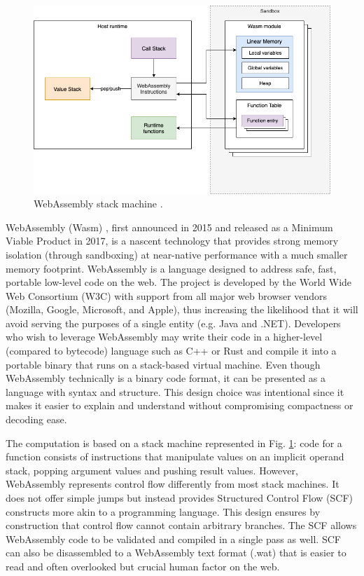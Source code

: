 \begin{figure}[ht]
\centering
\includegraphics[width=\columnwidth]{figures/webassembly}
\caption{WebAssembly stack machine \label{fig:webassembly}.}
\end{figure}

WebAssembly (Wasm) \cite{haas2017bringing}, first announced in 2015 and released as a Minimum Viable Product in 2017, is a nascent technology that provides strong memory isolation (through sandboxing) at near-native performance with a much smaller memory footprint. WebAssembly is a language designed to address safe, fast, portable low-level code on the web. The project is developed by the World Wide Web Consortium (W3C) with support from all major web browser vendors (Mozilla, Google, Microsoft, and Apple), thus increasing the likelihood that it will avoid serving the purposes of a single entity (e.g. Java and .NET). Developers who wish to leverage WebAssembly may write their code in a higher-level (compared to bytecode) language such as C++ or Rust and compile it into a portable binary that runs on a stack-based virtual machine. Even though WebAssembly technically is a binary code format, it can be presented as a language with syntax and structure. This design choice was intentional since it makes it easier to explain and understand without compromising compactness or decoding ease.


The computation is based on a stack machine represented in Fig. \ref{fig:webassembly}: code for a function consists of instructions that manipulate values on an implicit operand stack, popping argument values and pushing result values. However, WebAssembly represents control flow differently from most stack machines. It does not offer simple jumps but instead provides Structured Control Flow (SCF) constructs more akin to a programming language. This design ensures by construction that control flow cannot contain arbitrary branches. The SCF allows WebAssembly code to be validated and compiled in a single pass as well. SCF can also be disassembled to a WebAssembly text format (.wat) that is easier to read and often overlooked but crucial human factor on the web.

